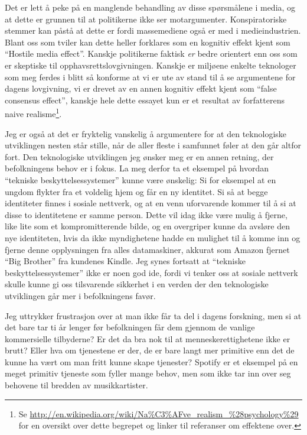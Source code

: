 \documentclass[11pt,norsk,a4paper]{article}
\begin{document}
Det er lett å peke på en manglende behandling av disse spørsmålene i
media, og at dette er grunnen til at politikerne ikke ser
motargumenter. Konspiratoriske stemmer kan påstå at dette er fordi
massemediene også er med i medieindustrien. Blant oss som tviler kan
dette heller forklares som en kognitiv effekt kjent som ``Hostile
media effect''. Kanskje politikerne faktisk \emph{er} bedre orientert
enn oss som er skeptiske til opphavsrettslovgivningen. Kanskje er
miljøene enkelte teknologer som meg ferdes i blitt så konforme at vi
er ute av stand til å se argumentene for dagens lovgivning, vi er
drevet av en annen kognitiv effekt kjent som ``false consensus
effect'', kanskje hele dette essayet kun er et resultat av
forfatterens naive
realisme\footnote{Se \url{http://en.wikipedia.org/wiki/Na\%C3\%AFve_realism_\%28psychology\%29}
for en oversikt over dette begrepet og linker til referanser om
effektene over.}.

Jeg er også at det er fryktelig vanskelig å argumentere for at
den teknologiske utviklingen nesten står stille, når de aller fleste i
samfunnet føler at den går altfor fort. Den teknologiske utviklingen
jeg ønsker meg er en annen retning, der befolkningens behov er i
fokus. La meg derfor ta et eksempel på hvordan ``tekniske
beskyttelsessystemer'' kunne være ønskelig: Si for eksempel at en ungdom
flykter fra et voldelig hjem og får en ny identitet. Si så at begge
identiteter finnes i sosiale nettverk, og at en venn uforvarende
kommer til å si at disse to identitetene er samme person. Dette vil
idag ikke være mulig å fjerne, like lite som et kompromitterende
bilde, og en overgriper kunne da avsløre den nye identiteten, hvis da
ikke myndighetene hadde en mulighet til å komme inn og fjerne denne
opplysningen fra alles datamaskiner, akkurat som Amazon fjernet ``Big
Brother'' fra kundenes Kindle. Jeg synes fortsatt at ``tekniske
beskyttelsessystemer'' ikke er noen god ide, fordi vi tenker oss at sosiale
nettverk skulle kunne gi oss tilsvarende sikkerhet i en verden der den
teknologiske utviklingen går mer i befolkningens favør.

Jeg uttrykker frustrasjon over at man ikke får ta del i dagens
forskning, men si at det bare tar ti år lenger før befolkningen får
dem gjennom de vanlige kommersielle tilbyderne? Er det da bra nok til
at menneskerettighetene ikke er brutt? Eller hva om tjenestene er der,
de er bare langt mer primitive enn det de kunne ha vært om man fritt
kunne skape tjenester? Spotify er et eksempel på en meget
primitiv tjeneste som fyller mange behov, men som ikke tar inn over
seg behovene til bredden av musikkartister. 
\end{document}
